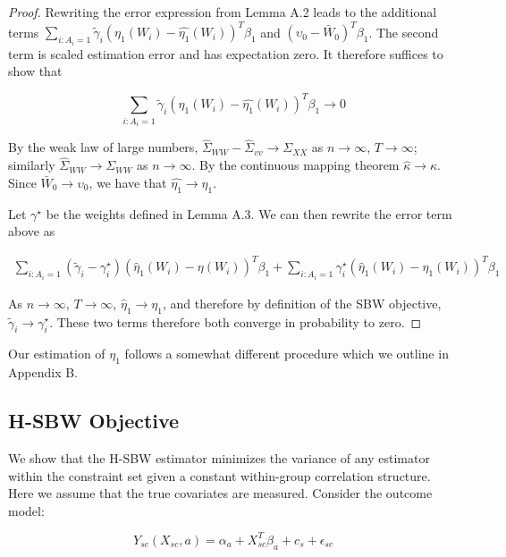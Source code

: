 \begin{proof}

Rewriting the error expression from Lemma A.2 leads to the additional terms $\sum_{i: A_i = 1}\tilde{\gamma}_i(\eta_1(W_i) - \hat{\eta_1}(W_i))^T\beta_1$ and $(\upsilon_0 - \bar{W}_0)^T\beta_1$. The second term is scaled estimation error and has expectation zero. It therefore suffices to show that 

$$
\sum_{i: A_i = 1}\tilde{\gamma}_i(\eta_1(W_i) - \hat{\eta_1}(W_i))^T\beta_1 \to 0
$$

By the weak law of large numbers, $\hat{\Sigma}_{WW} - \hat{\Sigma}_{vv} \to \Sigma_{XX}$ as $n \to \infty$, $T \to \infty$; similarly $\hat{\Sigma}_{WW} \to \Sigma_{WW}$ as $n \to \infty$. By the continuous mapping theorem $\hat{\kappa} \to \kappa$. Since $\bar{W}_0 \to \upsilon_0$, we have that $\hat{\eta_1} \to \eta_1$. 

Let $\gamma^\star$ be the weights defined in Lemma A.3. We can then rewrite the error term above as

\begin{align*}
\sum_{i: A_i = 1}(\tilde{\gamma}_i - \gamma_i^\star)(\hat{\eta}_1(W_i) - \eta(W_i))^T\beta_1 + \sum_{i: A_i = 1}\gamma_i^\star(\hat{\eta}_1(W_i) - \eta_1(W_i))^T\beta_1
\end{align*}

As $n \to \infty$, $T \to \infty$, $\hat{\eta}_1 \to \eta_1$, and therefore by definition of the SBW objective, $\tilde{\gamma}_i \to \gamma_i^\star$. These two terms therefore both converge in probability to zero. 

\end{proof}

Our estimation of $\eta_1$ follows a somewhat different procedure which we outline in Appendix B.

\subsection{H-SBW Objective}

We show that the H-SBW estimator minimizes the variance of any estimator within the constraint set given a constant within-group correlation structure. Here we assume that the true covariates are measured. Consider the outcome model:

\begin{equation}
    Y_{sc}(X_{sc}, a) = \alpha_a + X_{sc}^T\beta_a + c_s + \epsilon_{sc}
\end{equation}

